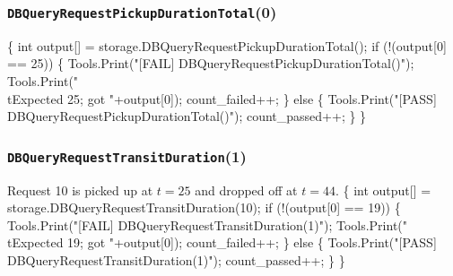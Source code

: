 \documentclass{article}
\def\nwendcode{\endtrivlist \endgroup}
\let\nwdocspar=\par
\begin{document}
\subsubsection{{\tt{}DBQueryRequestPickupDurationTotal}(0)}
\nwenddocs{}\endmoddef{}
\{
  int output[] = storage.DBQueryRequestPickupDurationTotal();
  if (!(output[0] == 25)) \{
    Tools.Print("[FAIL] DBQueryRequestPickupDurationTotal()");
    Tools.Print("\\tExpected 25; got "+output[0]);
    count_failed++;
  \} else \{
    Tools.Print("[PASS] DBQueryRequestPickupDurationTotal()");
    count_passed++;
  \}
\}
\nwendcode{}\nwdocspar
\subsubsection{{\tt{}DBQueryRequestTransitDuration}(1)}
Request 10 is picked up at $t=25$ and dropped off at $t=44$.
\nwenddocs{}\endmoddef{}
\{
  int output[] = storage.DBQueryRequestTransitDuration(10);
  if (!(output[0] == 19)) \{
    Tools.Print("[FAIL] DBQueryRequestTransitDuration(1)");
    Tools.Print("\\tExpected 19; got "+output[0]);
    count_failed++;
  \} else \{
    Tools.Print("[PASS] DBQueryRequestTransitDuration(1)");
    count_passed++;
  \}
\}
\nwendcode{}\nwdocspar
\end{document}
